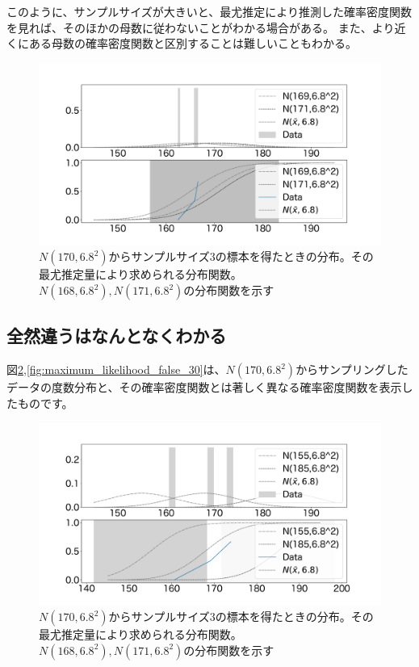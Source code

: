 このように、サンプルサイズが大きいと、最尤推定により推測した確率密度関数を見れば、そのほかの母数に従わないことがわかる場合がある。
また、より近くにある母数の確率密度関数と区別することは難しいこともわかる。

\begin{figure}
    \begin{center}
        \includegraphics[width=15cm]{./image/02_/maximum_likelihood_3.pdf}
        \caption{$N(170,6.8^2)$からサンプルサイズ$3$の標本を得たときの分布。その最尤推定量により求められる分布関数。$N(168,6.8^2),N(171,6.8^2)$の分布関数を示す}
        \label{fig:maximum_likelihood_0}
    \end{center}
\end{figure}

\fi

\subsection{全然違うはなんとなくわかる}
図\ref{fig:maximum_likelihood_false_3},\ref{fig:maximum_likelihood_false_30}は、$N(170,6.8^2)$からサンプリングしたデータの度数分布と、その確率密度関数とは著しく異なる確率密度関数を表示したものです。

\begin{figure}
    \begin{center}
        \includegraphics[width=15cm]{./image/02_/maximum_likelihood_false_3.pdf}
        \caption{$N(170,6.8^2)$からサンプルサイズ$3$の標本を得たときの分布。その最尤推定量により求められる分布関数。$N(168,6.8^2),N(171,6.8^2)$の分布関数を示す}
        \label{fig:maximum_likelihood_false_3}
    \end{center}
\end{figure}

